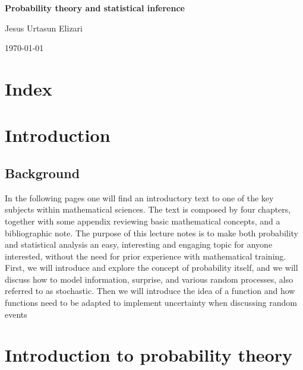 \documentclass{book}
\begin{document}
\frontmatter

\begin{titlepage}
    \centering
    \vspace*{\fill}
    {\Huge\bfseries Probability theory and statistical inference\par}
    \vspace{1cm}
    {\Large Jesus Urtasun Elizari\par}
    \vspace{1cm}
    {\large\today\par}
    \vspace*{\fill}
\end{titlepage}

\tableofcontents

\chapter*{Index}
\printindex

\mainmatter

\chapter*{Introduction}

\section{Background}
\indent In the following pages one will find an introductory text to one of the key subjects within mathematical sciences. The text is composed by four chapters, together with some appendix reviewing basic mathematical concepts, and a bibliographic note. The purpose of this lecture notes is to make both probability and statistical analysis an easy, interesting and engaging topic for anyone interested, without the need for prior experience with mathematical training.\\

First, we will introduce and explore the concept of probability itself, and we will discuss how to model information, surprise, and various random processes, also referred to as stochastic. Then we will introduce the idea of a function and how functions need to be adapted to implement uncertainty when discussing random events

\chapter{Introduction to probability theory}
\end{document}
